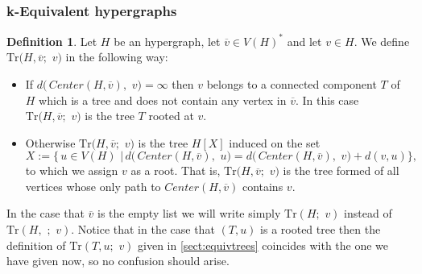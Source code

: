 \documentclass[12pt,notitlepage,a4paper]{article}
\theoremstyle{definition}
\newtheorem{definition}{Definition}[section]
\newcommand{\N}{\mathbb{N}}
\begin{document}
\subsubsection{k-Equivalent hypergraphs} \label{sect:equivunicycles}




\begin{definition}\label{def:TrOperator}
	Let $H$ be an hypergraph, let $\overline{v}\in V(H)^*$ and 
	let $v\in H$. We define $\mathrm{Tr}\big(
	H,\overline{v};\,\, v\big)$ in the following way:
	\begin{itemize}[leftmargin=*]
		\item If $d\big(\, Center(H, \overline{v})
		, \, \, v \big)=\infty$ then $v$ belongs to a connected
		component $T$ of $H$ which is a tree and does not contain
		any vertex in $\overline{v}$. In this case
		$\mathrm{Tr}\big(
		H,\overline{v};\,\, v\big)$ is the tree $T$ rooted at $v$.
		\item Otherwise $\mathrm{Tr}\big(
		H,\overline{v};\,\, v\big)$ is the tree $H[X]$ 
		induced on the set 
		\[
		X:=\big\{\, u\in V(H) \,\, \big| \, 
		d\big(\, Center(H, \overline{v})
		, \, \, u \big)= d\big(\, Center(H, \overline{v})
		, \, \, v \big) + d(v,u)
		\big\},
		\]
		to which we assign $v$ as a root. That is,
		$\mathrm{Tr}\big(
		H,\overline{v};\,\, v\big)$ is the tree formed of all 
		vertices whose only path to $Center(H,\overline{v})$ 
		contains $v$. 		
	\end{itemize}
	In the case that $\overline{v}$ is the empty list we will write
	simply $\mathrm{Tr}(H;\,\, v)$ 
	instead of 
	$\mathrm{Tr}(H,\, \, ;\,\, v)$.
	Notice that in the case that
	$(T,u)$ is a rooted tree then the definition of 
	$\mathrm{Tr}(T,u;\, \, v)$ given in \cref{sect:equivtrees}
	coincides with the one we have
	given now,
	so no confusion should arise. \par
\end{definition}
\end{document}

